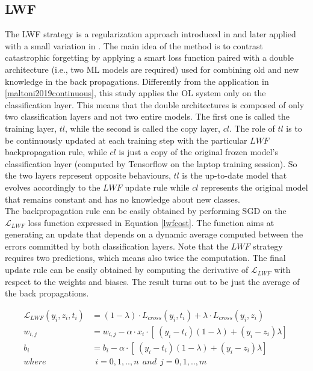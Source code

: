 \documentclass[12pt]{report}
\begin{document}
\subsection{LWF}
The LWF strategy is a regularization approach introduced in \cite{li2017learning} and later applied with a small variation in \cite{maltoni2019continuous}. The main idea of the method is to contrast catastrophic forgetting by applying a smart loss function paired with a double architecture (i.e., two ML models are required) used for combining old and new knowledge in the back propagations. Differently from the application in \ref{maltoni2019continuous}, this study applies the OL system only on the classification layer. This means that the double architectures is composed of only two classification layers and not two entire models. The first one is called the training layer, $tl$, while the second is called the copy layer, $cl$. The role of $tl$ is to be continuously updated at each training step with the particular $LWF$ backpropagation rule, while $cl$ is just a copy of the original frozen model's classification layer (computed by Tensorflow on the laptop training session). So the two layers represent opposite behaviours, $tl$ is the up-to-date model that evolves accordingly to the $LWF$ update rule while $cl$ represents the original model that remains constant and has no knowledge about new classes. \\
The backpropagation rule can be easily obtained by performing SGD on the $\mathcal{L}_{LWF}$ loss function expressed in Equation \ref{lwfcost}. The function aims at generating an update that depends on a dynamic average computed between the errors committed by both classification layers. Note that the $LWF$ strategy requires two predictions, which means also twice the computation. The final update rule can be easily obtained by computing the derivative of $\mathcal{L}_{LWF}$ with respect to the weights and biases. The result turns out to be just the average of the back propagations.

\begin{align}
	\mathcal{L}_{LWF} ( y_i, z_i, t_i) &=  (1-\lambda) \cdot{L}_{cross}(y_i, t_i) + \lambda \cdot{L}_{cross}(y_i, z_i) \label{lwfcost}\\
	w_{i,j} &= w_{i,j} - \alpha \cdot x_i \cdot [\ (y_i - t_i)(1-\lambda) + (y_i - z_i)\lambda ]\  \\
	b_i     &= b_i - \alpha \cdot [\ (y_i - t_i)(1-\lambda) + (y_i - z_i)\lambda ]\ \\
    where   & \: \: i= 0,1,..,n  \: \: and \: \:  j=0,1,..,m \nonumber  
\end{align}
\end{document}
